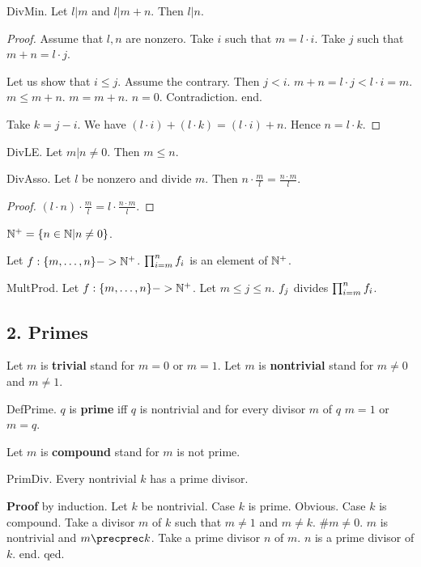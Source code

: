 \begin{lemma} DivMin.
Let $l | m$ and $l | m + n$. Then $l | n$.
\end{lemma}
\begin{proof}
Assume that $l,n$ are nonzero.
Take $i$ such that $m = l \cdot i$. 
Take $j$ such that $m + n = l \cdot j$.

Let us show that $i \leq j$.
Assume the contrary. Then $j < i$.
$m+n = l \cdot j < l \cdot i = m$. 
$m \leq m+n$.
$m = m+n$. $n=0$.
Contradiction. end.
 
Take $k = j - i$.
We have $(l \cdot i) + (l \cdot k) = (l \cdot i) + n$.
Hence $n = l \cdot k$.
\end{proof}

\begin{lemma} DivLE.
Let $m | n \neq 0$. Then $m \leq n$.
\end{lemma}

\begin{lemma} DivAsso.
Let $l$ be nonzero and divide $m$.
Then $n \cdot \frac{m}{l} = \frac{n \cdot m}{l}$.\end{lemma}
\begin{proof}
$(l \cdot n) \cdot \frac{m}{l} = l \cdot \frac{n \cdot m}{l}$.
\end{proof}

\begin{definitionp}
$\NNplus = \{n \in \NN | n \neq 0 \}$.
\end{definitionp}

\begin{signaturep}  
Let $f : \Seq{m}{n} -> \NNplus$.
$\Product{f}{m}{n}$ is an element of $\NNplus$.
\end{signaturep}

\begin{axiom} MultProd.
Let $f : \Seq{m}{n} -> \NNplus$.
Let $m \leq j \leq n$.
$\subfunc{f}{j}$ divides $\Product{f}{m}{n}$.
\end{axiom}

\subsection{2. Primes} 


Let $m$ is {\bf trivial} stand for $m = 0$ or $m = 1$.
Let $m$ is {\bf nontrivial} stand for $m \neq 0$ and $m \neq 1$.

\begin{definition} DefPrime.
$q$ is {\bf prime} iff $q$ is nontrivial and
for every divisor $m$ of $q$ $m = 1$ or $m = q$.
\end{definition}

Let $m$ is {\bf compound} stand for $m$ is not prime.

\begin{lemma} PrimDiv.
Every nontrivial $k$ has a prime divisor.
\end{lemma}
{\bf Proof} by induction.
Let $k$ be nontrivial.
Case $k$ is prime. Obvious.
Case $k$ is compound. 
Take a divisor $m$ of $k$ such that $m \neq 1$ and $m \neq k$.
#$m \neq 0$.
$m$ is nontrivial and $m \precprec k$.
Take a prime divisor $n$ of $m$.
$n$ is a prime divisor of $k$.
end.
qed.



